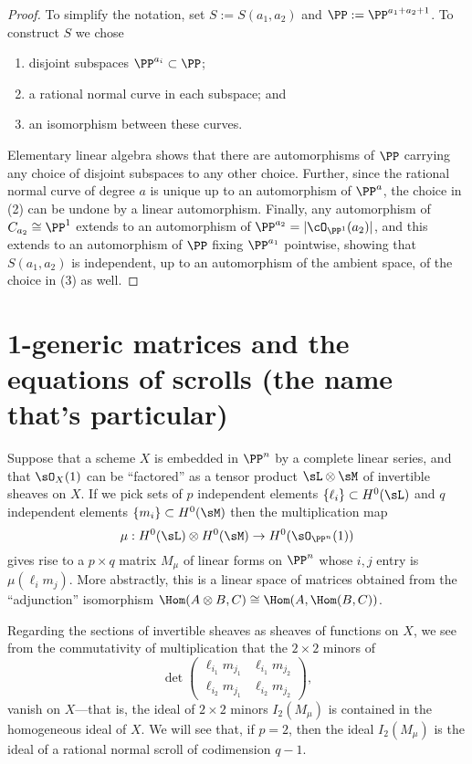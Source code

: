 \begin{proof} 
To simplify the notation, set $S := S(a_{1}, a_{2})$ and $\PP := \PP^{a_1+a_2+1}$.
To construct $S$ we chose 
\begin{enumerate}
 \item disjoint subspaces $\PP^{a_i}\subset \PP$;
 \item a rational normal curve in each subspace; and
 \item an isomorphism between these curves.
\end{enumerate}
Elementary linear algebra shows that there are automorphisms of $\PP$ carrying any choice of disjoint subspaces to any other choice. Further, since the rational normal curve of degree $a$ is unique up to an automorphism of $\PP^{a}$, the choice in (2) can be undone by a linear automorphism. Finally, any automorphism of $C_{a_{2}}\cong \PP^{1}$ extends to an automorphism of $\PP^{a_{2}} = |\cO_{\PP^{1}}(a_{2})|$, and this extends to an automorphism of $\PP$ fixing $\PP^{a_{1}}$ pointwise,
showing that $S(a_{1}, a_{2})$ is independent, up to an automorphism of the ambient space, of the choice in (3)  as well.
\end{proof}



\section{1-generic matrices and the equations of scrolls
(the name that's particular)}\label{particular name}

Suppose that a scheme $X $ is embedded in $\PP^n$ by a complete linear series, and that
$\sO_X(1)$ can be ``factored'' as a tensor product $\sL\otimes \sM$ of invertible sheaves on $X$. If we pick sets of $p$ independent elements $\{\ell_i\}\subset H^0(\sL)$ and  $q$ independent elements $\{m_i\} \subset H^0(\sM)$ then the multiplication map 
$$
\mu: H^0(\sL) \otimes H^0(\sM) \to H^0(\sO_{\PP^n}(1))
$$
 gives rise to 
a $p\times q$ matrix $M_\mu$ of linear forms on $\PP^n$ whose $i,j$ entry is $\mu(\ell_im_j)$.
More abstractly, this is a linear space of matrices obtained from the ``adjunction'' isomorphism 
$\Hom(A\otimes B, C)\cong \Hom(A, \Hom(B,C))$.

Regarding the sections of invertible sheaves as sheaves of functions on $X$, we see from the commutativity of
multiplication that the $2\times 2$ minors
of 
$$
\det \begin{pmatrix}
\ell_{i_1}m_{j_1} & \ell_{i_1}m_{j_2}\\
\ell_{i_2}m_{j_1} &\ell_{i_2}m_{j_2}  
\end{pmatrix},
$$
vanish on $X$---that is, the ideal of $2\times 2$ minors $I_2(M_\mu)$ is contained in the homogeneous ideal
of $X$. 
We will see that, if $p=2$, then the ideal $I_2(M_\mu)$
is the ideal of a rational normal scroll of codimension $q-1$.

